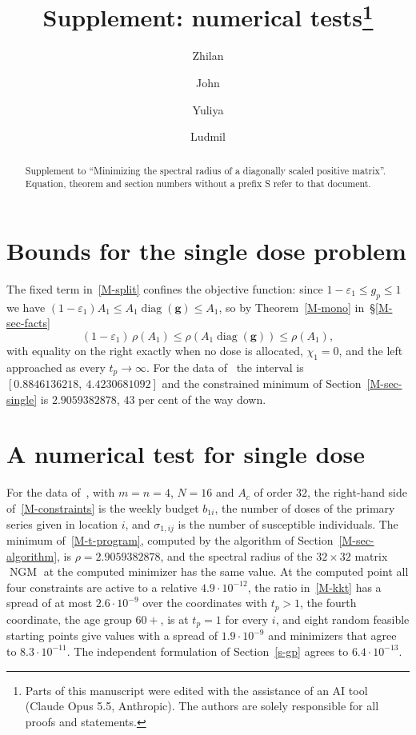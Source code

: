 \documentclass[11pt]{article}
\title{Supplement: numerical tests\thanks{Parts of this manuscript were edited with the assistance of an AI tool (Claude Opus 5.5, Anthropic). The authors are solely responsible for all proofs and statements.}}
\author{Zhilan \and John \and Yuliya \and Ludmil}
\date{}
\theoremstyle{plain}
\theoremstyle{remark}
\numberwithin{equation}{section}
\begin{document}
\maketitle

\begin{abstract}
Supplement to ``Minimizing the spectral radius of a diagonally scaled positive
matrix''. Equation, theorem and section numbers without a prefix S refer to
that document.
\end{abstract}

\section{Bounds for the single dose problem}\label{s-bounds}

The fixed term in~\eqref{M-split} confines the objective function: since
$1-\varepsilon_1\le g_p\le 1$ we have
$(1-\varepsilon_1)A_1\le A_1\operatorname{diag}(\bm g)\le A_1$, so by
Theorem~\ref{M-mono} in~\S\ref{M-sec-facts}
\begin{equation}\label{s-two-sided}
(1-\varepsilon_1)\,\rho(A_1)\le\rho\left(A_1\operatorname{diag}(\bm g)\right)\le\rho(A_1),
\end{equation}
with equality on the right exactly when no dose is allocated, $\chi_1=0$, and
the left approached as every $t_p\to\infty$. For the data of~\cite{JZh} the
interval is $\left\lbrack 0.8846136218,\ 4.4230681092\right\rbrack$ and the
constrained minimum of Section~\ref{M-sec-single} is $2.9059382878$, $43$ per cent
of the way down.

\section{A numerical test for single dose}\label{s-test}

For the data of~\cite{JZh}, with $m=n=4$, $N=16$ and $A_c$ of order $32$, the
right-hand side of~\eqref{M-constraints} is the weekly budget $b_{1i}$, the
number of doses of the primary series given in location $i$, and
$\sigma_{1,ij}$ is the number of susceptible individuals. The minimum
of~\eqref{M-t-program}, computed by the algorithm of
Section~\ref{M-sec-algorithm}, is $\rho=2.9059382878$, and the spectral radius of
the $32\times 32$ matrix $\operatorname{NGM}$ at the computed minimizer has the
same value. At the computed point all four constraints are active to a
relative $4.9\cdot 10^{-12}$, the ratio in~\eqref{M-kkt} has a spread of at most
$2.6\cdot 10^{-9}$ over the coordinates with $t_p>1$, the fourth coordinate,
the age group $60+$, is at $t_p=1$ for every $i$, and eight random feasible
starting points give values with a spread of $1.9\cdot 10^{-9}$ and minimizers
that agree to $8.3\cdot 10^{-11}$. The independent formulation of
Section~\ref{s-gp} agrees to $6.4\cdot 10^{-13}$.
\end{document}
